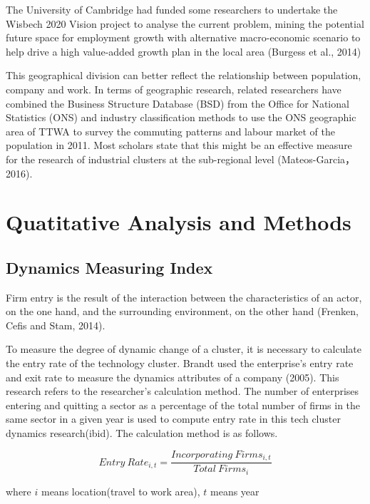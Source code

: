 \documentclass[
  12pt,
  oneside]{book}
\begin{document}
The University of Cambridge had funded some researchers to undertake the Wisbech 2020 Vision project to analyse the current problem, mining the potential future space for employment growth with alternative macro-economic scenario to help drive a high value-added growth plan in the local area (Burgess et al., 2014)

This geographical division can better reflect the relationship between population, company and work. In terms of geographic research, related researchers have combined the Business Structure Database (BSD) from the Office for National Statistics (ONS) and industry classification methods to use the ONS geographic area of TTWA to survey the commuting patterns and labour market of the population in 2011. Most scholars state that this might be an effective measure for the research of industrial clusters at the sub-regional level (Mateos-Garcia，2016).

\hypertarget{quatitative-analysis-and-methods}{%
\section{Quatitative Analysis and Methods}\label{quatitative-analysis-and-methods}}

\hypertarget{dynamics-measuring-index}{%
\subsection{Dynamics Measuring Index}\label{dynamics-measuring-index}}

Firm entry is the result of the interaction between the
characteristics of an actor, on the one hand, and the surrounding environment, on the other hand (Frenken, Cefis and Stam, 2014).

To measure the degree of dynamic change of a cluster, it is necessary to calculate the entry rate of the technology cluster. Brandt used the enterprise's entry rate and exit rate to measure the dynamics attributes of a company (2005). This research refers to the researcher's calculation method. The number of enterprises entering and quitting a sector as a percentage of the total number of firms in the same sector in a given year is used to compute entry rate in this tech cluster dynamics research(ibid). The calculation method is as follows.

\[ 
Entry\ Rate_{i,t} = \frac{Incorporating\ Firms_{i,t}}{Total\  Firms_{i}} 
\]

where \(i\) means location(travel to work area), \(t\) means year
\end{document}
